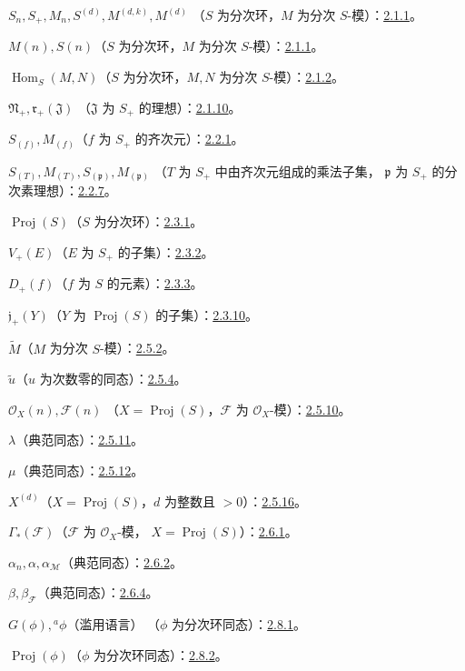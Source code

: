 \documentclass[UTF8,fontset=none,11pt,oneside,openany]{ctexbook}
\providecommand{\vphi}{\phi}
\providecommand{\Hom}{\operatorname{Hom}}
\providecommand{\Proj}{\operatorname{Proj}}
\begin{document}
$S_n,S_+,M_n,S^{(d)},M^{(d,k)},M^{(d)}$
（$S$ 为分次环，$M$ 为分次 $S$-模）：\hyperref[II.2.1.1-zh]{2.1.1}。

$M(n),S(n)$（$S$ 为分次环，$M$ 为分次 $S$-模）：\hyperref[II.2.1.1-zh]{2.1.1}。

$\Hom_S(M,N)$（$S$ 为分次环，$M,N$ 为分次 $S$-模）：\hyperref[II.2.1.2-zh]{2.1.2}。

$\mathfrak N_+,\mathfrak r_+(\mathfrak J)$
（$\mathfrak J$ 为 $S_+$ 的理想）：\hyperref[II.2.1.10-zh]{2.1.10}。

$S_{(f)},M_{(f)}$（$f$ 为 $S_+$ 的齐次元）：\hyperref[II.2.2.1-zh]{2.2.1}。

$S_{(T)},M_{(T)},S_{(\mathfrak p)},M_{(\mathfrak p)}$
（$T$ 为 $S_+$ 中由齐次元组成的乘法子集，
$\mathfrak p$ 为 $S_+$ 的分次素理想）：\hyperref[II.2.2.7-zh]{2.2.7}。

$\Proj(S)$（$S$ 为分次环）：\hyperref[II.2.3.1-zh]{2.3.1}。

$V_+(E)$（$E$ 为 $S_+$ 的子集）：\hyperref[II.2.3.2-zh]{2.3.2}。

$D_+(f)$（$f$ 为 $S$ 的元素）：\hyperref[II.2.3.3-zh]{2.3.3}。

$\mathfrak j_+(Y)$（$Y$ 为 $\Proj(S)$ 的子集）：\hyperref[II.2.3.10-zh]{2.3.10}。

$\widetilde M$（$M$ 为分次 $S$-模）：\hyperref[II.2.5.2-zh]{2.5.2}。

$\widetilde u$（$u$ 为次数零的同态）：\hyperref[II.2.5.4-zh]{2.5.4}。

$\mathcal{O}_X(n),\mathcal{F}(n)$
（$X=\Proj(S)$，$\mathcal{F}$ 为 $\mathcal{O}_X$-模）：\hyperref[II.2.5.10-zh]{2.5.10}。

$\lambda$（典范同态）：\hyperref[II.2.5.11-zh]{2.5.11}。

$\mu$（典范同态）：\hyperref[II.2.5.12-zh]{2.5.12}。

$X^{(d)}$（$X=\Proj(S)$，$d$ 为整数且 $>0$）：\hyperref[II.2.5.16-zh]{2.5.16}。

$\Gamma_*(\mathcal{F})$（$\mathcal{F}$ 为 $\mathcal{O}_X$-模，
$X=\Proj(S)$）：\hyperref[II.2.6.1-zh]{2.6.1}。

$\alpha_n,\alpha,\alpha_{\mathcal{M}}$（典范同态）：\hyperref[II.2.6.2-zh]{2.6.2}。

$\beta,\beta_{\mathcal{F}}$（典范同态）：\hyperref[II.2.6.4-zh]{2.6.4}。

$G(\vphi),{}^a\vphi$（滥用语言）
（$\vphi$ 为分次环同态）：\hyperref[II.2.8.1-zh]{2.8.1}。

$\Proj(\vphi)$（$\vphi$ 为分次环同态）：\hyperref[II.2.8.2-zh]{2.8.2}。
\end{document}
